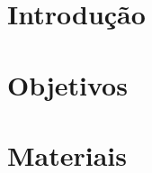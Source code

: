 \documentclass[a4paper, 11pt]{article}
\begin{document}
    

    \section{Introdução}\label{sec:intro}
    

    \section{Objetivos}\label{sec:objetivos}
    

    \section{Materiais}\label{sec:materiais}
    
	
    \nocite{*}
    
    
\end{document}
